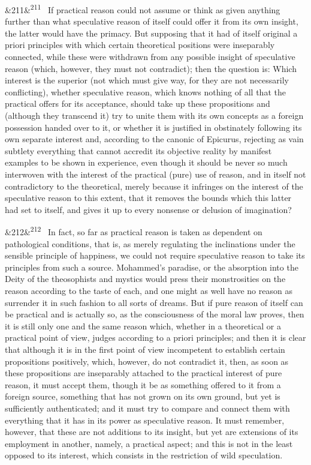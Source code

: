 \documentclass[12pt]{article}
\newcommand{\para}[1][]{\par\noindent\ifx&#1&\else\textsuperscript{\footnotesize #1}~\fi}
\begin{document}
\para[211] If practical reason could not assume or think as given anything further than what speculative reason of itself could offer it from its own insight, the latter would have the primacy. But supposing that it had of itself original a priori principles with which certain theoretical positions were inseparably connected, while these were withdrawn from any possible insight of speculative reason (which, however, they must not contradict); then the question is: Which interest is the superior (not which must give way, for they are not necessarily conflicting), whether speculative reason, which knows nothing of all that the practical offers for its acceptance, should take up these propositions and (although they transcend it) try to unite them with its own concepts as a foreign possession handed over to it, or whether it is justified in obstinately following its own separate interest and, according to the canonic of Epicurus, rejecting as vain subtlety everything that cannot accredit its objective reality by manifest examples to be shown in experience, even though it should be never so much interwoven with the interest of the practical (pure) use of reason, and in itself not contradictory to the theoretical, merely because it infringes on the interest of the speculative reason to this extent, that it removes the bounds which this latter had set to itself, and gives it up to every nonsense or delusion of imagination?

\para[212] In fact, so far as practical reason is taken as dependent on pathological conditions, that is, as merely regulating the inclinations under the sensible principle of happiness, we could not require speculative reason to take its principles from such a source. Mohammed's paradise, or the absorption into the Deity of the theosophists and mystics would press their monstrosities on the reason according to the taste of each, and one might as well have no reason as surrender it in such fashion to all sorts of dreams. But if pure reason of itself can be practical and is actually so, as the consciousness of the moral law proves, then it is still only one and the same reason which, whether in a theoretical or a practical point of view, judges according to a priori principles; and then it is clear that although it is in the first point of view incompetent to establish certain propositions positively, which, however, do not contradict it, then, as soon as these propositions are inseparably attached to the practical interest of pure reason, it must accept them, though it be as something offered to it from a foreign source, something that has not grown on its own ground, but yet is sufficiently authenticated; and it must try to compare and connect them with everything that it has in its power as speculative reason. It must remember, however, that these are not additions to its insight, but yet are extensions of its employment in another, namely, a practical aspect; and this is not in the least opposed to its interest, which consists in the restriction of wild speculation.
\end{document}
